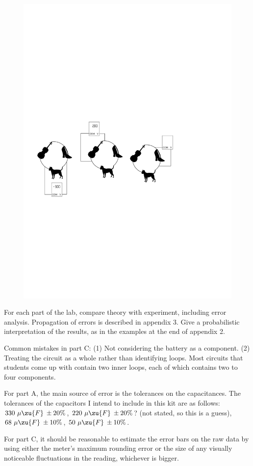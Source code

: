\begin{figure}
  \includegraphics{../figs/em-fie-terrier-conservative}\label{fig:terrier-conservative}
\end{figure}

\analysis

For each part of the lab, compare theory with experiment, including error analysis.
Propagation of errors is described in appendix 3.
Give a probabilistic interpretation of the results, as in the examples at the end of appendix 2.

Common mistakes in part C: (1) Not considering the battery as a component.
(2) Treating the circuit as a whole rather than identifying loops. Most circuits
that students come up with contain two inner loops, each of which contains two to four
components.

For part A, the main source of error is the tolerances on
the capacitances.
The tolerances of the capacitors I intend to include in this kit are as
follows:
$330\ \mu\zu{F}\:\pm 20\%$,
$220\ \mu\zu{F}\:\pm 20\%$? (not stated, so this is a guess),
$68\ \mu\zu{F}\:\pm 10\%$,
$50\ \mu\zu{F}\:\pm 10\%$. 

For part C, it should be reasonable to estimate the error bars on the raw
data by using either the meter's maximum rounding error or the size of any visually
noticeable fluctuations in the reading, whichever is bigger.

